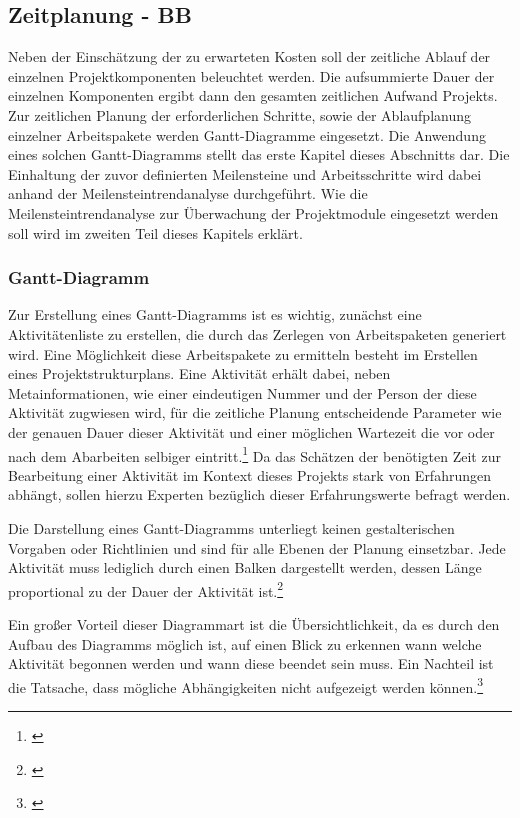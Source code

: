 
\subsection{Zeitplanung - BB}

Neben der Einschätzung der zu erwarteten Kosten soll der zeitliche Ablauf der einzelnen Projektkomponenten beleuchtet werden. Die aufsummierte Dauer der einzelnen Komponenten ergibt dann den gesamten zeitlichen Aufwand Projekts. Zur zeitlichen Planung der erforderlichen Schritte, sowie der Ablaufplanung einzelner Arbeitspakete werden Gantt-Diagramme eingesetzt. Die Anwendung eines solchen Gantt-Diagramms stellt das erste Kapitel dieses Abschnitts dar. Die Einhaltung der zuvor definierten Meilensteine und Arbeitsschritte wird dabei anhand der Meilensteintrendanalyse durchgeführt. Wie die Meilensteintrendanalyse zur Überwachung der Projektmodule eingesetzt werden soll wird im zweiten Teil dieses Kapitels erklärt.

\subsubsection{Gantt-Diagramm}
Zur Erstellung eines Gantt-Diagramms ist es wichtig, zunächst eine Aktivitätenliste zu erstellen, die durch das Zerlegen von Arbeitspaketen generiert wird. Eine Möglichkeit diese Arbeitspakete zu ermitteln besteht im Erstellen eines Projektstrukturplans. Eine Aktivität erhält dabei, neben Metainformationen, wie einer eindeutigen Nummer und der Person der diese Aktivität zugwiesen wird, für die zeitliche Planung entscheidende Parameter wie der genauen Dauer dieser Aktivität und einer möglichen Wartezeit die vor oder nach dem Abarbeiten selbiger eintritt.\footnote{\cite{kraus_projekt_2010}}  Da das Schätzen der benötigten Zeit zur Bearbeitung einer Aktivität im Kontext dieses Projekts stark von Erfahrungen abhängt, sollen hierzu Experten bezüglich dieser Erfahrungswerte befragt werden.

Die Darstellung eines Gantt-Diagramms unterliegt keinen gestalterischen Vorgaben oder Richtlinien und sind für alle Ebenen der Planung einsetzbar. Jede Aktivität muss lediglich durch einen Balken dargestellt werden, dessen Länge proportional zu der Dauer der Aktivität ist.\footnote{\cite{jakoby_intensivtraining_2015}}

Ein großer Vorteil dieser Diagrammart ist die Übersichtlichkeit, da es durch den Aufbau des Diagramms möglich ist, auf einen Blick zu erkennen wann welche Aktivität begonnen werden und wann diese beendet sein muss. Ein Nachteil ist die Tatsache, dass mögliche Abhängigkeiten nicht aufgezeigt werden können.\footnote{\cite{kraus_projekt_2010}}

